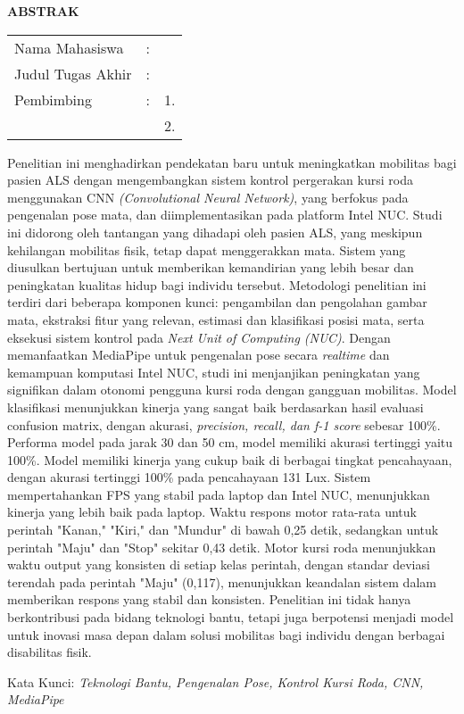 \begin{center}
  \large\textbf{ABSTRAK}
\end{center}


\vspace{2ex}

\begingroup
\setlength{\tabcolsep}{0pt}

\noindent
\begin{tabularx}{\textwidth}{l >{\centering}m{2em} X}
  Nama Mahasiswa    & : & \name{}         \\

  Judul Tugas Akhir & : & \tatitle{}      \\

  Pembimbing        & : & 1. \advisor{}   \\
                    &   & 2. \coadvisor{} \\
\end{tabularx}
\endgroup

Penelitian ini menghadirkan pendekatan baru untuk meningkatkan mobilitas bagi pasien ALS dengan mengembangkan sistem kontrol pergerakan kursi roda menggunakan CNN \emph{(Convolutional Neural Network)}, yang berfokus pada pengenalan pose mata, dan diimplementasikan pada platform Intel NUC. Studi ini didorong oleh tantangan yang dihadapi oleh pasien ALS, yang meskipun kehilangan mobilitas fisik, tetap dapat menggerakkan mata. Sistem yang diusulkan bertujuan untuk memberikan kemandirian yang lebih besar dan peningkatan kualitas hidup bagi individu tersebut. Metodologi penelitian ini terdiri dari beberapa komponen kunci: pengambilan dan pengolahan gambar mata, ekstraksi fitur yang relevan, estimasi dan klasifikasi posisi mata, serta eksekusi sistem kontrol pada \textit{Next Unit of Computing (NUC)}. Dengan memanfaatkan MediaPipe untuk pengenalan pose secara \emph{realtime} dan kemampuan komputasi Intel NUC, studi ini menjanjikan peningkatan yang signifikan dalam otonomi pengguna kursi roda dengan gangguan mobilitas.  Model klasifikasi menunjukkan kinerja yang sangat baik berdasarkan hasil evaluasi confusion matrix, dengan akurasi, \emph{precision, recall, dan f-1 score} sebesar 100\%. Performa model pada jarak 30 dan 50 cm, model memiliki akurasi tertinggi yaitu 100\%. Model memiliki kinerja yang cukup baik di berbagai tingkat pencahayaan, dengan akurasi tertinggi 100\% pada pencahayaan 131 Lux. Sistem mempertahankan FPS yang stabil pada laptop dan Intel NUC, menunjukkan kinerja yang lebih baik pada laptop. Waktu respons motor rata-rata untuk perintah "Kanan," "Kiri," dan "Mundur" di bawah 0,25 detik, sedangkan untuk perintah "Maju" dan "Stop" sekitar 0,43 detik. Motor kursi roda menunjukkan waktu output yang konsisten di setiap kelas perintah, dengan standar deviasi terendah pada perintah "Maju" (0,117), menunjukkan keandalan sistem dalam memberikan respons yang stabil dan konsisten. Penelitian ini tidak hanya berkontribusi pada bidang teknologi bantu, tetapi juga berpotensi menjadi model untuk inovasi masa depan dalam solusi mobilitas bagi individu dengan berbagai disabilitas fisik.

Kata Kunci: \emph{Teknologi Bantu, Pengenalan Pose, Kontrol Kursi Roda, CNN, MediaPipe}